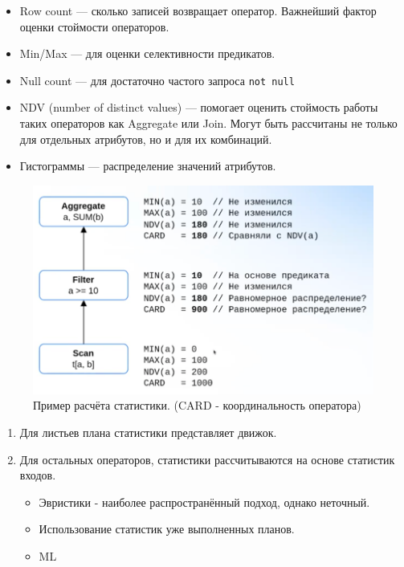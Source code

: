 \documentclass[11pt]{article}
\begin{document}
    \begin{itemize}
        \item Row count --- сколько записей возвращает оператор.
        Важнейший фактор оценки стоймости операторов.
        \item Min/Max --- для оценки селективности предикатов.
        \item Null count --- для достаточно частого запроса \texttt{not null}
        \item NDV (number of distinct values) --- помогает оценить стоймость работы таких операторов как Aggregate или Join.
        Могут быть рассчитаны не только для отдельных атрибутов, но и для их комбинаций.
        \item Гистограммы --- распределение значений атрибутов.
    \end{itemize}

    \begin{figure}[h!]
        \centering
        \includegraphics[width = \textwidth]{Pictures/Metadata/Рассчёт статистик}
        \caption{Пример расчёта статистики. (CARD - координальность оператора)}
        \label{fig:counting_statistics}
    \end{figure}

    \begin{enumerate}
        \item Для листьев плана статистики представляет движок.
        \item Для остальных операторов, статистики рассчитываются на основе статистик входов.
        \begin{itemize}
            \item Эвристики - наиболее распространённый подход, однако неточный.
            \item Использование статистик уже выполненных планов.
            \item ML
        \end{itemize}
    \end{enumerate}
\end{document}
